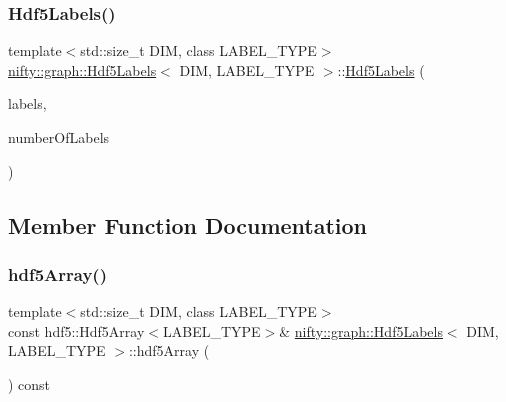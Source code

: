 \subsubsection{\texorpdfstring{Hdf5\+Labels()}{Hdf5Labels()}}
{\footnotesize\ttfamily template$<$std\+::size\+\_\+t D\+IM, class L\+A\+B\+E\+L\+\_\+\+T\+Y\+PE$>$ \\
\hyperlink{classnifty_1_1graph_1_1Hdf5Labels}{nifty\+::graph\+::\+Hdf5\+Labels}$<$ D\+IM, L\+A\+B\+E\+L\+\_\+\+T\+Y\+PE $>$\+::\hyperlink{classnifty_1_1graph_1_1Hdf5Labels}{Hdf5\+Labels} (\begin{DoxyParamCaption}\item[{const \hyperlink{classnifty_1_1graph_1_1Hdf5Labels_a2cfeca010fa78ee8fdfa1767ae0fbe4a}{Hdf5\+Array\+Type} \&}]{labels,  }\item[{const uint64\+\_\+t}]{number\+Of\+Labels }\end{DoxyParamCaption})\hspace{0.3cm}{\ttfamily [inline]}}



\subsection{Member Function Documentation}
\mbox{\label{classnifty_1_1graph_1_1Hdf5Labels_a978766e66e04b140f29a7908b67cb1cb}} 
\subsubsection{\texorpdfstring{hdf5\+Array()}{hdf5Array()}}
{\footnotesize\ttfamily template$<$std\+::size\+\_\+t D\+IM, class L\+A\+B\+E\+L\+\_\+\+T\+Y\+PE$>$ \\
const hdf5\+::\+Hdf5\+Array$<$L\+A\+B\+E\+L\+\_\+\+T\+Y\+PE$>$\& \hyperlink{classnifty_1_1graph_1_1Hdf5Labels}{nifty\+::graph\+::\+Hdf5\+Labels}$<$ D\+IM, L\+A\+B\+E\+L\+\_\+\+T\+Y\+PE $>$\+::hdf5\+Array (\begin{DoxyParamCaption}{ }\end{DoxyParamCaption}) const\hspace{0.3cm}{\ttfamily [inline]}}

\mbox{\label{classnifty_1_1graph_1_1Hdf5Labels_a63aff9c294ce5bf1ab1913a7e8bd09ef}} 
